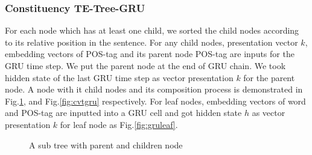 \subsubsection{Constituency TE-Tree-GRU} \label{sec:VTtreeConstituency}
For each node which has at least one child, we sorted the child nodes according to its relative position in the sentence. 
For any child nodes, presentation vector \(k\), embedding vectors of POS-tag and its parent node POS-tag are inputs for the GRU time step. 
We put the parent node at the end of GRU chain. We took hidden state of the last GRU time step as vector presentation \(k\) for the parent node. 
A node with it child nodes and its composition process is demonstrated in Fig.\ref{fig:treecp}, and Fig.\ref{fig:cvtgru} respectively. 
For leaf nodes, embedding vectors of word and POS-tag are inputted into a GRU cell and got hidden state \(h\) as vector presentation \(k\) for leaf node as Fig.\ref{fig:gruleaf}.
\begin{figure}[H]
    \centering
    \caption[A sub tree with parent and children node]{A sub tree with parent and children node}
    \label{fig:treecp}
\end{figure}

